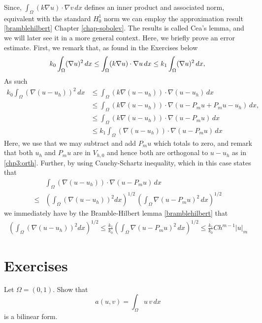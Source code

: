 Since, $\int_\Omega (k \nabla u) \cdot \nabla v \, dx$ defines an inner product and associated norm, equivalent with 
the standard $H^1_0$ norm we can employ the approximation result \eqref{bramblehilbert} Chapter \ref{chap-sobolev}. 
The results is called Cea's lemma, and we will later see it in a more general context. 
Here, we briefly prove an error estimate. First, we remark that, as found in the Exercises below  
\[
k_0 \int_\Omega (\nabla u)^2  \, dx \le   \int_\Omega (k \nabla u) \cdot \nabla u \, dx \le   
k_1 \int_\Omega (\nabla u)^2  \, dx,  \\  
\]
As such 
\begin{align*}
	k_0 \int_\Omega (\nabla (u-u_h))^2  \, dx &\le   \int_\Omega (k \nabla (u -u_h)) \cdot \nabla (u-u_h) \, dx \\    
&\le   \int_\Omega (k \nabla (u -u_h)) \cdot \nabla (u-P_m u + P_m u - u_h) \, dx, \\ 
&\le   \int_\Omega (k \nabla (u -u_h)) \cdot \nabla (u-P_m u ) \, dx \\ 
&\le   k_1 \int_\Omega (\nabla (u -u_h)) \cdot \nabla (u-P_m u ) \, dx 
\end{align*}
Here, we use that we may subtract and add $P_m u$ which totals to zero, and remark that both $u_h$ and $P_m u$ 
are in $V_{h,0}$ and hence both are orthogonal to $u - u_h$ as in \eqref{chp3:orth}. 
Further, by using Cauchy-Schartz inequality, which in this case states that   
\begin{align*}
&  \int_\Omega ( \nabla (u -u_h)) \cdot \nabla (u-P_m u ) \, dx \\ \le  
&  
(\int_\Omega ( \nabla (u -u_h))^{2} dx )^{1/2} \,  (\int_\Omega \nabla (u-P_m u )^2 \, dx)^{1/2} 
\end{align*}
we immediately have by the Bramble-Hilbert lemma \eqref{bramblehilbert} that 
\begin{align}
(\int_\Omega ( \nabla (u -u_h))^{2} dx )^{1/2} \le \frac{k_1}{k_0}   (\int_\Omega \nabla (u-P_m u )^2 \, dx)^{1/2} 
 \le \frac{k_1}{k_0}  C h^{m-1} |u|_{m} 
\end{align}


\section{Exercises}

\begin{exercise}
\label{ex:bilinear}
Let $\Omega=(0,1)$.  
Show that 
\[  
a(u, v) = \int_\Omega  u \, v \, dx 
\]
is a bilinear form. 
\end{exercise}

